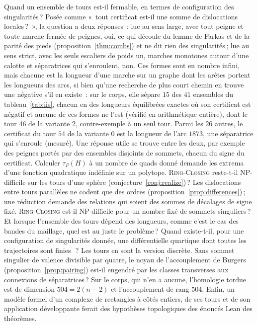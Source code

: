 \documentclass[11pt,a4paper]{article}
\newcommand{\RC}{\textup{\textsc{Ring-Closing}}}
\begin{document}
Quand un ensemble de tours est-il fermable, en termes de configuration des
singularités\,? Posée comme «~tout certificat est-il une somme de
dislocations locales\,?~», la question a deux réponses~: lue au sens large,
avec tout peigne et toute marche fermée de peignes, oui, ce qui découle du
lemme de Farkas et de la parité des pieds (proposition~\ref{thm:combs}) et ne
dit rien des singularités\,; lue au sens strict, avec les seuls escaliers de
poids un, marches monotones autour d'une calotte et séparatrices qui
s'enroulent, non. Ces formes sont en nombre infini, mais chacune est la
longueur d'une marche sur un graphe dont les arêtes portent les longueurs des
arcs, si bien qu'une recherche de plus court chemin en trouve une négative
s'il en existe~: sur le corps, elle sépare $15$ des $41$ ensembles du
tableau~\ref{tab:iis}, chacun en des longueurs équilibrées exactes où son
certificat est négatif et aucune de ces formes ne l'est (vérifié en
arithmétique entière), dont le tour $46$ de la variante 2, contre-exemple à un
seul tour. Parmi les $26$ autres, le certificat du tour $54$ de la variante 0
est la longueur de l'arc $1873$, une séparatrice qui s'enroule (mesuré). Une
réponse utile se trouve entre les deux, par exemple des peignes portés par des
ensembles disjoints de sommets, chacun du signe du certificat. Calculer $\tau_P(H)$ à un nombre de quads donné
demande les extrema d'une fonction quadratique indéfinie sur un polytope.
\RC{} reste-t-il NP-difficile sur les tours d'une sphère
(conjecture~\ref{conj:realize})\,? Les dislocations entre tours parallèles
ne codent que des ordres (proposition~\ref{prop:differences})\,; une
réduction demande des relations qui soient des sommes de décalages de signe
fixé. \RC{} est-il NP-difficile pour un nombre fixé de sommets singuliers\,? Et
lorsque l'ensemble des tours dépend des longueurs, comme c'est le cas des
bandes du maillage, quel est au juste le problème\,? Quand existe-t-il, pour
une configuration de singularités donnée, une différentielle quartique dont
toutes les trajectoires sont finies~\cite{lei2020quartic}\,? Les tours en sont
la version discrète. Sans sommet singulier de valence divisible par quatre,
le noyau de l'accouplement de Burgers (proposition~\ref{prop:pairing})
est-il engendré par les classes transverses aux connexions de séparatrices\,?
Sur le corps, qui n'en a aucune, l'homologie tordue est de dimension $504 =
2(n - 2)$ et l'accouplement de rang $504$. Enfin, un modèle formel d'un complexe de rectangles à
côtés entiers, de ses tours et de son application développante ferait des
hypothèses topologiques des énoncés Lean des théorèmes.
\end{document}
